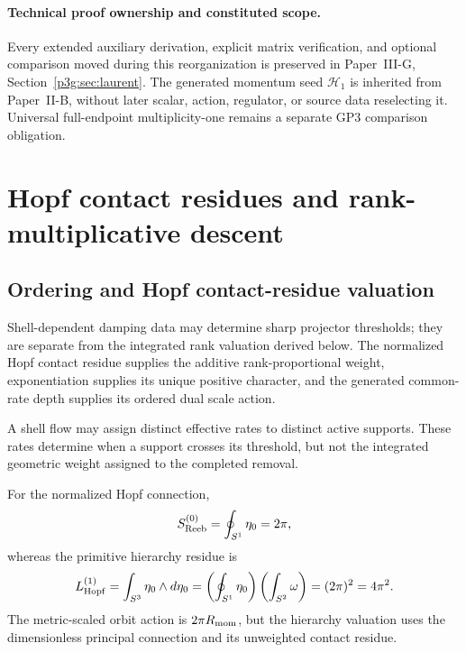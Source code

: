 \documentclass[12pt,a4paper]{article}
\begin{document}
\paragraph{Technical proof ownership and constituted scope.}
Every extended auxiliary derivation, explicit matrix verification,
and optional comparison moved during this reorganization is
preserved in Paper~III-G, Section~\ref{p3g:sec:laurent}.
The generated momentum seed \(\mathcal H_1\) is inherited from
Paper~II-B, without later scalar, action, regulator, or source data
reselecting it.  Universal full-endpoint multiplicity-one remains a
separate GP3 comparison obligation.

\section{Hopf contact residues and rank-multiplicative descent}
\label{paper3d:sec:organized-contact}
\subsection{Ordering and Hopf contact-residue valuation}
\label{p3:sec:reeb-universality}

Shell-dependent damping data may determine sharp projector thresholds; they
are separate from the integrated rank valuation derived below.  The
normalized Hopf contact residue supplies the additive rank-proportional
weight, exponentiation supplies its unique positive character, and the
generated common-rate depth supplies its ordered dual scale action.

\begin{definition}
\label{p3:def:effective-damping-ordering}
A shell flow may assign distinct effective rates to distinct active supports.
These rates determine when a support crosses its threshold, but not the
integrated geometric weight assigned to the completed removal.
\end{definition}

\begin{definition}
\label{p3:def:reeb-phase-contact-residue-distance}
For the normalized Hopf connection,
\[
S_{\rm Reeb}^{(0)}=\oint_{S^1}\eta_0=2\pi,
\]
whereas the primitive hierarchy residue is
\[
L_{\mathrm{Hopf}}^{(1)}
=\int_{S^3}\eta_0\wedge d\eta_0
=\left(\oint_{S^1}\eta_0\right)\left(\int_{S^2}\omega\right)
=(2\pi)^2=4\pi^2.
\]
The metric-scaled orbit action is \(2\pi R_{\mathrm{mom}}\), but the hierarchy valuation
uses the dimensionless principal connection and its unweighted contact
residue.
\end{definition}
\end{document}
